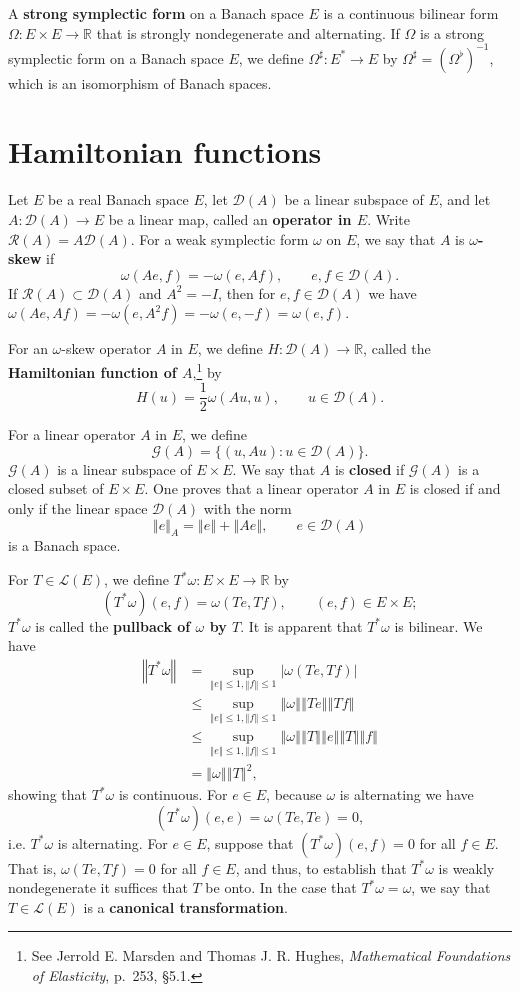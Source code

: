 \documentclass{article}
\newcommand{\norm}[1]{\left\Vert #1 \right\Vert}
\theoremstyle{definition}
\theoremstyle{definition}
\begin{document}
A \textbf{strong symplectic form} on a Banach space $E$ is a continuous bilinear form
$\Omega:E \times E \to \mathbb{R}$ that is
strongly nondegenerate and  alternating. If $\Omega$ is a strong symplectic form on a Banach space $E$, we define
$\Omega^\sharp:E^* \to E$ by $\Omega^\sharp = (\Omega^\flat)^{-1}$, which is an isomorphism of Banach spaces.




\section{Hamiltonian functions}
Let $E$ be a  real Banach space $E$, let $\mathscr{D}(A)$ be a linear subspace of $E$, and let
$A:\mathscr{D}(A) \to E$ be a linear map, called an \textbf{operator in $E$}. Write
$\mathscr{R}(A)=A \mathscr{D}(A)$.
For a weak symplectic form $\omega$ on $E$, we say that $A$ is \textbf{$\omega$-skew} if
\[
\omega(Ae,f) = -\omega(e,Af), \qquad e,f \in \mathscr{D}(A).
\]
If $\mathscr{R}(A) \subset \mathscr{D}(A)$ and $A^2=-I$, then for $e,f \in \mathscr{D}(A)$ we have
$\omega(Ae,Af)=-\omega(e,A^2f)=-\omega(e,-f)=\omega(e,f)$. 

For an $\omega$-skew operator $A$ in $E$, we define $H:\mathscr{D}(A) \to \mathbb{R}$,
called the \textbf{Hamiltonian function of $A$},\footnote{See Jerrold E. Marsden and Thomas J. R. Hughes, {\em Mathematical Foundations of Elasticity}, p.~253, \S 5.1.}
 by
\[
H(u) = \frac{1}{2}\omega(Au,u), \qquad u \in \mathscr{D}(A).
\]

For a linear operator $A$ in $E$, we define 
\[
\mathscr{G}(A) = \{(u,Au): u \in \mathscr{D}(A)\}.
\]
$\mathscr{G}(A)$ is a linear subspace of $E \times E$. We say that
$A$ is \textbf{closed} if $\mathscr{G}(A)$ is a closed subset of $E \times E$. 
One proves that a linear operator $A$ in $E$ is closed if and only if 
the linear space $\mathscr{D}(A)$ with the norm
\[
\norm{e}_A = \norm{e}+\norm{Ae}, \qquad e \in \mathscr{D}(A)
\]
is a Banach space. 

For $T \in \mathscr{L}(E)$, we define $T^*\omega:E \times E \to \mathbb{R}$ by
\[
(T^*\omega)(e,f) = \omega(Te,Tf), \qquad (e,f) \in E \times E;
\]
 $T^*\omega$ is called the \textbf{pullback of $\omega$ by $T$}. It is apparent that $T^*\omega$ is  bilinear.
 We have
 \begin{align*}
 \norm{T^*\omega}&=\sup_{\norm{e} \leq 1, \norm{f} \leq 1}
 |\omega(Te,Tf)|\\
 &\leq \sup_{\norm{e} \leq 1, \norm{f} \leq 1} \norm{\omega} \norm{Te} \norm{Tf}\\
 &\leq \sup_{\norm{e} \leq 1, \norm{f} \leq 1} \norm{\omega} \norm{T} \norm{e}
 \norm{T} \norm{f}\\
 &=\norm{\omega} \norm{T}^2,
 \end{align*}
 showing that $T^*\omega$ is continuous. For $e \in E$, because $\omega$ is alternating we have
 \[
 (T^*\omega)(e,e) = \omega(Te,Te) = 0,
 \]
 i.e. $T^*\omega$ is alternating. 
 For $e \in E$, suppose that $(T^*\omega)(e,f)=0$ for all $f \in E$. That is,
 $\omega(Te,Tf)=0$ for all $f \in E$, and thus, to establish that $T^*\omega$ is weakly nondegenerate it suffices that
 $T$ be onto. In the case that $T^*\omega = \omega$, we say that $T \in \mathscr{L}(E)$ is a \textbf{canonical transformation}.
\end{document}
